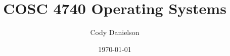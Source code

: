 \title{COSC 4740 Operating Systems} %
\def\homework{Written Q1}
\author{Cody Danielson}
\date{\today}
